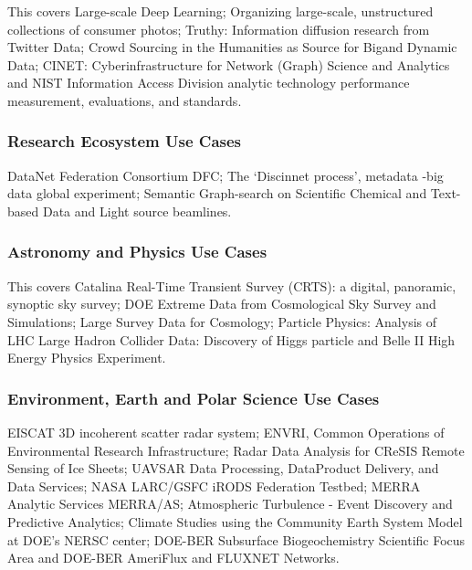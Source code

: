 This covers Large-scale Deep Learning; Organizing large-scale,
unstructured collections of consumer photos; Truthy: Information
diffusion research from Twitter Data; Crowd Sourcing in the Humanities
as Source for Bigand Dynamic Data; CINET: Cyberinfrastructure for
Network (Graph) Science and Analytics and NIST Information Access
Division analytic technology performance measurement, evaluations, and
standards.




\subsubsection{Research Ecosystem Use
Cases}\label{research-ecosystem-use-cases}

DataNet Federation Consortium DFC; The `Discinnet process', metadata
-big data global experiment; Semantic Graph-search on Scientific
Chemical and Text-based Data and Light source beamlines.




\subsubsection{Astronomy and Physics Use
Cases}\label{astronomy-and-physics-use-cases}

This covers Catalina Real-Time Transient Survey (CRTS): a digital,
panoramic, synoptic sky survey; DOE Extreme Data from Cosmological Sky
Survey and Simulations; Large Survey Data for Cosmology; Particle
Physics: Analysis of LHC Large Hadron Collider Data: Discovery of Higgs
particle and Belle II High Energy Physics Experiment.





\subsubsection{Environment, Earth and Polar Science Use
Cases}\label{environment-earth-and-polar-science-use-cases}

EISCAT 3D incoherent scatter radar system; ENVRI, Common Operations of
Environmental Research Infrastructure; Radar Data Analysis for CReSIS
Remote Sensing of Ice Sheets; UAVSAR Data Processing, DataProduct
Delivery, and Data Services; NASA LARC/GSFC iRODS Federation Testbed;
MERRA Analytic Services MERRA/AS; Atmospheric Turbulence - Event
Discovery and Predictive Analytics; Climate Studies using the Community
Earth System Model at DOE's NERSC center; DOE-BER Subsurface
Biogeochemistry Scientific Focus Area and DOE-BER AmeriFlux and FLUXNET
Networks.


